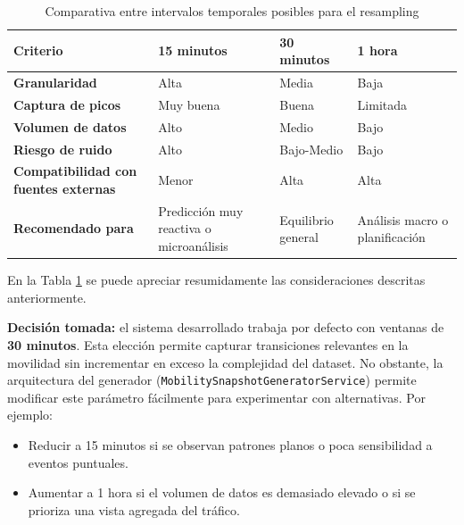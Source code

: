 \begin{table}[H]
	\centering
	\caption{Comparativa entre intervalos temporales posibles para el resampling}
	\label{tab:resample_comparison}
	\renewcommand{\arraystretch}{1.4}
	\begin{tabularx}{\textwidth}{lXXX}
		\toprule
		\textbf{Criterio} & \textbf{15 minutos} & \textbf{30 minutos} & \textbf{1 hora} \\
		\midrule
		\textbf{Granularidad} & Alta & Media & Baja \\
		\textbf{Captura de picos} & Muy buena & Buena & Limitada \\
		\textbf{Volumen de datos} & Alto & Medio & Bajo \\
		\textbf{Riesgo de ruido} & Alto & Bajo-Medio & Bajo \\
		\textbf{Compatibilidad con fuentes externas} & Menor & Alta & Alta \\
		\textbf{Recomendado para} &
		Predicción muy reactiva o microanálisis &
		Equilibrio general &
		Análisis macro o planificación \\
		\bottomrule
	\end{tabularx}
\end{table}

En la Tabla \ref{tab:resample_comparison} se puede apreciar resumidamente las consideraciones descritas anteriormente.

\vspace{1em}
\noindent \textbf{Decisión tomada:} el sistema desarrollado trabaja por defecto con ventanas de \textbf{30 minutos}. Esta elección permite capturar transiciones relevantes en la movilidad sin incrementar en exceso la complejidad del dataset. No obstante, la arquitectura del generador (\texttt{MobilitySnapshotGeneratorService}) permite modificar este parámetro fácilmente para experimentar con alternativas. Por ejemplo:

\begin{itemize}
	\item Reducir a 15 minutos si se observan patrones planos o poca sensibilidad a eventos puntuales.
	\item Aumentar a 1 hora si el volumen de datos es demasiado elevado o si se prioriza una vista agregada del tráfico.
\end{itemize}


